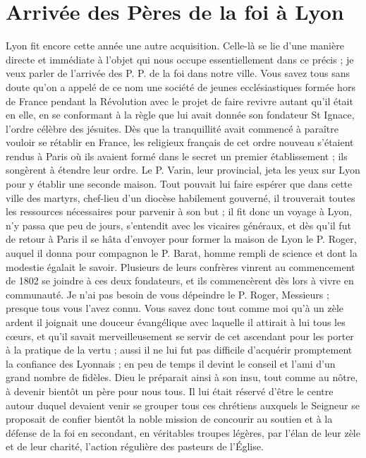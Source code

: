 \section*{Arrivée des Pères de la foi à Lyon}
Lyon fit encore cette année une autre acquisition. Celle-là se lie d'une manière directe et immédiate à l'objet qui nous occupe essentiellement dans ce précis ; je veux parler de l'arrivée des P. P. de la foi dans notre ville. Vous savez tous sans doute qu'on a appelé de ce nom une société de jeunes ecclésiastiques formée hors de France pendant la Révolution avec le projet de faire revivre autant qu'il était en elle, en se conformant à la règle que lui avait donnée son fondateur St Ignace, l'ordre célèbre des jésuites. Dès que la tranquillité avait commencé à paraître vouloir se rétablir en France, les religieux français de cet ordre nouveau s'étaient rendus à Paris où ils avaient formé dans le secret un premier établissement ; ils songèrent à étendre leur ordre. Le P. Varin, leur provincial, jeta les yeux sur Lyon pour y établir une seconde maison. Tout pouvait lui faire espérer que dans cette ville des martyrs, chef-lieu d'un diocèse habilement gouverné, il trouverait toutes les ressources nécessaires pour parvenir à son but ; il fit donc un voyage à Lyon, n'y
passa que peu de jours, s'entendit avec les vicaires généraux, et dès qu'il fut de retour à Paris il se hâta d'envoyer pour former la maison de Lyon le P. Roger, auquel il donna pour compagnon le P. Barat, homme rempli de science et dont la modestie égalait le savoir. Plusieurs de leurs confrères vinrent au commencement de 1802 se joindre à ces deux fondateurs, et ils commencèrent dès lors à vivre en communauté. Je n'ai pas besoin de vous dépeindre le P. Roger, Messieurs ; presque tous vous l'avez connu. Vous savez donc tout comme moi qu'à un zèle ardent il joignait une douceur évangélique avec laquelle il attirait à lui tous les cœurs, et qu'il savait merveilleusement se servir de cet ascendant pour les porter à la pratique de la vertu ; aussi il ne lui fut pas difficile d'acquérir promptement la confiance des Lyonnais ; en peu de temps il devint le conseil et l'ami d'un grand nombre de fidèles. Dieu le préparait ainsi à son insu, tout comme au nôtre, à devenir bientôt un père pour nous tous. Il lui était réservé d'être le centre autour duquel devaient venir se grouper tous ces chrétiens auxquels le Seigneur se proposait de confier bientôt la noble mission de concourir au soutien et à la défense de la foi en secondant, en véritables troupes légères, par l'élan de leur zèle et de leur charité, l'action régulière des pasteurs de l'Église.
